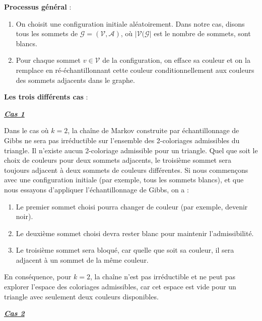 \documentclass{article}
\begin{document}
\vspace{.2cm}
\textbf{Processus général} :
\begin{enumerate}[left=1cm]
    \item On choisit une configuration initiale aléatoirement. 
    Dans notre cas, disons tous les sommets de 
    $\mathcal{G}=(\mathcal{V},\mathcal{A})$, où 
    $|\mathcal{V}(\mathcal{G}|$ est le nombre de sommets, sont blancs.
    \item Pour chaque sommet $v\in\mathcal{V}$ de la configuration,
    on efface sa couleur et on la remplace en ré-échantillonnant cette couleur
    conditionnellement aux couleurs des sommets adjacents dans le graphe. 
\end{enumerate}

\vspace{.1cm}
\textbf{Les trois différents cas} : 

\vspace{.3cm}
\underline{\textbf{\textit{Cas 1}}}

\vspace{.1cm}
Dans le cas où $k=2$, la chaîne de Markov construite par échantillonnage de 
Gibbs ne sera pas irréductible sur l'ensemble des 2-coloriages admissibles 
du triangle. Il n'existe aucun 2-coloriage admissible pour un triangle. Quel que 
soit le choix de couleurs pour deux sommets adjacents, le troisième sommet sera 
toujours adjacent à deux sommets de couleurs différentes. Si nous commençons avec 
une configuration initiale (par exemple, tous les sommets blancs), et que nous 
essayons d'appliquer l'échantillonnage de Gibbs, on a :
\begin{enumerate}[left=1cm]
    \item Le premier sommet choisi pourra changer de couleur (par exemple, devenir noir).
    \item Le deuxième sommet choisi devra rester blanc pour maintenir l'admissibilité.
    \item Le troisième sommet sera bloqué, car quelle que soit sa couleur, il sera 
            adjacent à un sommet de la même couleur.
\end{enumerate}

En conséquence, pour $k=2$, la chaîne n'est pas irréductible et ne peut pas explorer 
l'espace des coloriages admissibles, car cet espace est vide pour un triangle avec 
seulement deux couleurs disponibles.

\vspace{.3cm}
\underline{\textbf{\textit{Cas 2}}}
\end{document}
